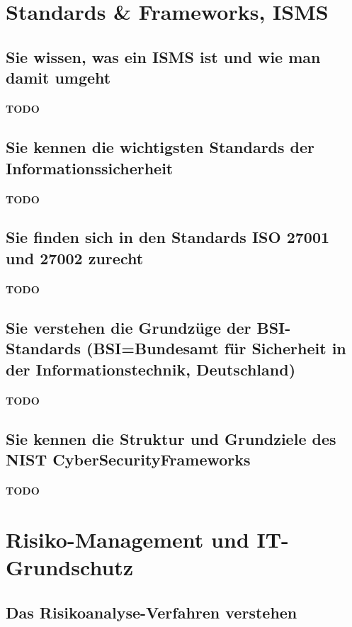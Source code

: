 \documentclass[10pt,a4paper]{article}
\begin{document}
\section{Standards \& Frameworks, ISMS}
\subsection*{Sie wissen, was ein ISMS ist und wie man damit umgeht}
\paragraph*{TODO}
\subsection*{Sie kennen die wichtigsten Standards der Informationssicherheit}
\paragraph*{TODO}
\subsection*{Sie finden sich in den Standards ISO 27001 und 27002 zurecht}
\paragraph*{TODO}
\subsection*{Sie verstehen die Grundzüge der BSI-Standards (BSI=Bundesamt für Sicherheit in der Informationstechnik, Deutschland)}
\paragraph*{TODO}
\subsection*{Sie kennen die Struktur und Grundziele des NIST CyberSecurityFrameworks}
\paragraph*{TODO}


\section{Risiko-Management und IT-Grundschutz}
\subsection*{Das Risikoanalyse-Verfahren verstehen}
\end{document}

